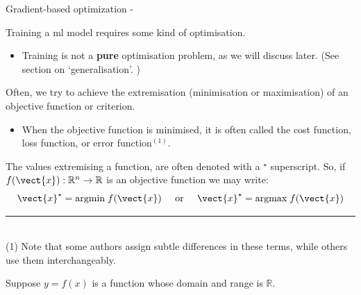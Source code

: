 
\begin{frame}[t,allowframebreaks]{Gradient-based optimization -}


    Training a \gls{ml} model requires 
    some kind of \gls{optimisation}.
    \begin{itemize}
        \item Training is not a {\bf pure} \gls{optimisation} problem, 
        as we will discuss later. (See section on `\Gls{generalisation}'. 
        \hyperlink{sec:Generalisation}{})
    \end{itemize}
    \vspace{0.2cm}

    Often, we try to achieve the \gls{extremisation} 
    (minimisation or maximisation) of an 
    \gls{objective function} or 
    \gls{criterion}.
    \begin{itemize}
        \item 
            When the \gls{objective function} is minimised, 
            it is often called the
            \gls{cost function},
            \gls{loss function}, or
            \gls{error function}$^{(1)}$.
    \end{itemize}
    \vspace{0.2cm}
    The values extremising a function, 
    are often denoted with a $^\star$ superscript.
    So, if $f(\vect{x}): \mathbb{R}^n \rightarrow \mathbb{R}$ 
    is an \gls{objective function}
    we may write:
    \begin{equation*}
        \vect{x}^{\star} = \mathrm{argmin} \; f(\vect{x})
        \;\;\;\;\; \textrm{or} \;\;\;\;\;
        \vect{x}^{\star} = \mathrm{argmax} \; f(\vect{x})
    \end{equation*}

    \vspace{0.1cm}
    \noindent\rule{4cm}{0.4pt}\\
    {\tiny
    (1) Note that some authors assign subtle differences in these terms,
    while others use them interchangeably.\\
    }
    
    \framebreak


    Suppose $y=f(x)$ is a function whose domain and range is $\mathbb{R}$.\\
    \vspace{0.2cm}


\end{frame}
